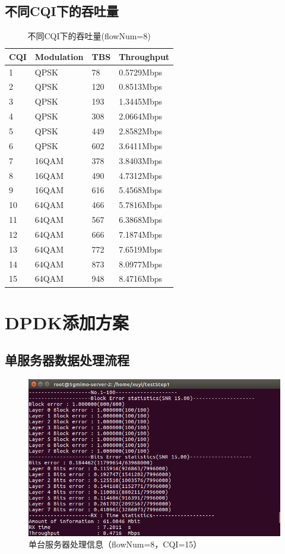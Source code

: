 \documentclass{article}
\begin{document}
\subsection{不同CQI下的吞吐量}
\begin{table}[H]
\caption{不同CQI下的吞吐量(flowNum=8)}
\centering
\begin{tabular}{|l|l|l|l|}%
	\hline  %
	CQI &	Modulation	&	TBS	&	Throughput	\\
	\hline
	1	&	QPSK		&	78	&	0.5729Mbps	\\
	\hline
	2	&	QPSK		&	120	&	0.8513Mbps	\\
	\hline
	3	&	QPSK		&	193	&	1.3445Mbps	\\
	\hline
	4	&	QPSK		&	308	&	2.0664Mbps	\\
	\hline
	5	&	QPSK		&	449	&	2.8582Mbps	\\
	\hline
	6	&	QPSK		&	602	&	3.6411Mbps	\\
	\hline
	7	&	16QAM		&	378	&	3.8403Mbps	\\
	\hline
	8	&	16QAM		&	490	&	4.7312Mbps	\\
	\hline
	9	&	16QAM		&	616	&	5.4568Mbps	\\
	\hline
	10	&	64QAM		&	466	&	5.7816Mbps	\\
	\hline
	11	&	64QAM		&	567	&	6.3868Mbps	\\
	\hline
	12	&	64QAM		&	666	&	7.1874Mbps	\\
	\hline
	13	&	64QAM		&	772	&	7.6519Mbps	\\
	\hline
	14	&	64QAM		&	873	&	8.0977Mbps	\\
	\hline
	15	&	64QAM		&	948	&	8.4716Mbps	\\
	\hline  %
\end{tabular}
\end{table}

\section{DPDK添加方案}

\subsection{单服务器数据处理流程}
\begin{figure}[H]
	\centering
	\includegraphics[width = .8\textwidth]{result_server.png}
	\caption{单台服务器处理信息（flowNum=8，CQI=15）}
\end{figure}
\end{document}
